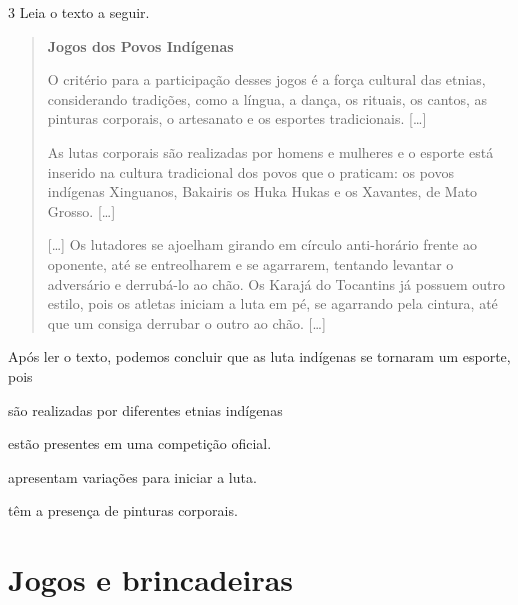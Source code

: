 \num{3} Leia o texto a seguir.

\begin{quote}
\textbf{Jogos dos Povos Indígenas}

O critério para a participação desses jogos é a força cultural das
etnias, considerando tradições, como a língua, a dança, os rituais, os
cantos, as pinturas corporais, o artesanato e os esportes tradicionais.
{[}\ldots{}{]}

As lutas corporais são realizadas por homens e mulheres e o esporte está
inserido na cultura tradicional dos povos que o praticam: os povos
indígenas Xinguanos, Bakairis os Huka Hukas e os Xavantes, de Mato
Grosso. {[}\ldots{}{]}

{[}\ldots{}{]} Os lutadores se ajoelham girando em círculo anti-horário
frente ao oponente, até se entreolharem e se agarrarem, tentando
levantar o adversário e derrubá-lo ao chão. Os Karajá do Tocantins já
possuem outro estilo, pois os atletas iniciam a luta em pé, se agarrando
pela cintura, até que um consiga derrubar o outro ao chão. {[}\ldots{}{]}

\end{quote}

\noindent{}Após ler o texto, podemos concluir que as luta indígenas se tornaram um
esporte, pois

\begin{escolha}
\item são realizadas por diferentes etnias indígenas

\item estão presentes em uma competição oficial.

\item apresentam variações para iniciar a luta.

\item têm a presença de pinturas corporais.
\end{escolha}



\chapter{Jogos e brincadeiras}



